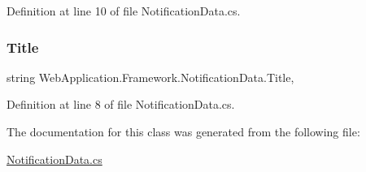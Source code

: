 Definition at line 10 of file Notification\+Data.\+cs.

\mbox{\label{classWebApplication_1_1Framework_1_1NotificationData_a4c00314a56a6d3bd97d52af56b783783}} 
\subsubsection{\texorpdfstring{Title}{Title}}
{\footnotesize\ttfamily string Web\+Application.\+Framework.\+Notification\+Data.\+Title\hspace{0.3cm}{\ttfamily [get]}, {\ttfamily [set]}}



Definition at line 8 of file Notification\+Data.\+cs.



The documentation for this class was generated from the following file\+:\begin{DoxyCompactItemize}
\item 
\mbox{\hyperlink{NotificationData_8cs}{Notification\+Data.\+cs}}\end{DoxyCompactItemize}

